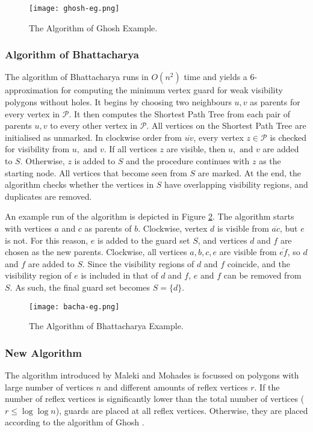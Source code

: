\begin{figure}[h!]
    \centering
    \texttt{[image: ghosh-eg.png]}
    \caption{The Algorithm of Ghosh \cite{GHOSH2010718} Example.}
    \label{fig:ghosh}
\end{figure}

\subsubsection{Algorithm of Bhattacharya \cite{bhattacharya2016approximability}}
The algorithm of Bhattacharya \cite{bhattacharya2016approximability} runs in $O(n^2)$ time and yields a 6-approximation for computing the minimum vertex guard for weak visibility polygons without holes. It begins by choosing two neighbours $u, v$ as parents for every vertex in $\mathcal P$. It then computes the Shortest Path Tree from each pair of parents $u, v$ to every other vertex in $\mathcal P$. All vertices on the Shortest Path Tree are initialised as unmarked. In clockwise order from $\overline{uv}$, every vertex $z \in \mathcal P$ is checked for visibility from $u, \text{ and } v$. If all vertices $z$ are visible, then $u, \text{ and }v$ are added to $S$. Otherwise, $z$ is added to $S$ and the procedure continues with $z$ as the starting node. All vertices that become seen from $S$ are marked. At the end, the algorithm checks whether the vertices in $S$ have overlapping visibility regions, and duplicates are removed.

An example run of the algorithm is depicted in Figure \ref{fig:bhaca}. The algorithm starts with vertices $a$ and $c$ as parents of $b$. Clockwise, vertex $d$ is visible from $\overline{ac}$, but $e$ is not. For this reason, $e$ is added to the guard set $S$, and vertices $d$ and $f$ are chosen as the new parents. Clockwise, all vertices $a, b, c, e$ are visible from $\overline{ef}$, so $d$ and $f$ are added to $S$. Since the visibility regions of $d$ and $f$ coincide, and the visibility region of $e$ is included in that of $d$ and $f$, $e$ and $f$ can be removed from $S$. As such, the final guard set becomes $S = \{d\}$.

\begin{figure}[h!]
    \centering
    \texttt{[image: bacha-eg.png]}
    \caption{The Algorithm of Bhattacharya \cite{bhattacharya2016approximability} Example.}
    \label{fig:bhaca}
\end{figure}

\subsubsection{New Algorithm}
The algorithm introduced by Maleki and Mohades is focussed on polygons with large number of vertices $n$ and different amounts of reflex vertices $r$. If the number of reflex vertices is significantly lower than the total number of vertices ($r \leq \log \log n$), guards are placed at all reflex vertices. Otherwise, they are placed according to the algorithm of Ghosh \cite{GHOSH2010718}.

